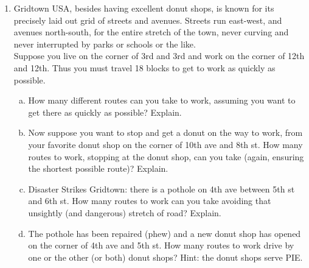 \documentclass[11pt, a4paper]{article}
\newcommand\setItemNumber[1]{\setcounter{enumi}{\numexpr#1-1\relax}}
\newcommand{\forceindent}{\leavevmode{\parindent=1em\indent}}
\begin{document}
\begin{enumerate}
        \setItemNumber{11}
        \item Gridtown USA, besides having excellent donut shops, is known for its precisely laid out grid of streets and avenues. Streets run east-west, and avenues north-south, for the entire stretch of the town, never curving and never interrupted by parks or schools or the like.\\\forceindent Suppose you live on the corner of 3rd and 3rd and work on the corner of 12th and 12th. Thus you must travel 18 blocks to get to work as quickly as possible.
            \begin{enumerate}[(a)]

                \item How many different routes can you take to work, assuming you want to get there as quickly as possible? Explain.

                \item Now suppose you want to stop and get a donut on the way to work, from your favorite donut shop on the corner of 10th ave and 8th st. How many routes to work, stopping at the donut shop, can you take (again, ensuring the shortest possible route)? Explain.

                \item Disaster Strikes Gridtown: there is a pothole on 4th ave between 5th st and 6th st. How many routes to work can you take avoiding that unsightly (and dangerous) stretch of road? Explain.

                \item The pothole has been repaired (phew) and a new donut shop has opened on the corner of 4th ave and 5th st. How many routes to work drive by one or the other (or both) donut shops? Hint: the donut shops serve PIE.
            \end{enumerate}

    \end{enumerate}

	
\end{document}
